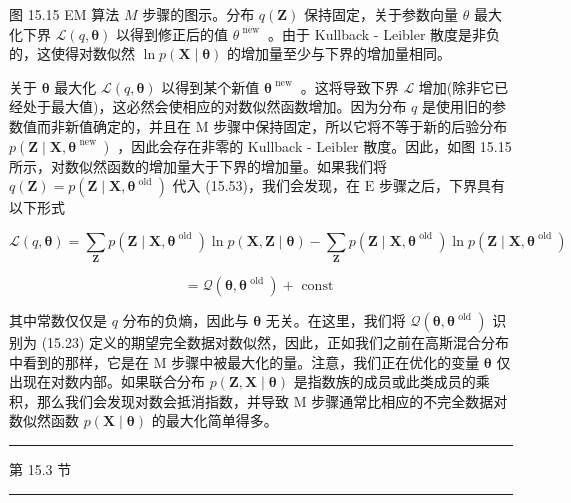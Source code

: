 \documentclass[10pt]{article}
\newcommand{\HRule}{\begin{center}\rule{0.9\linewidth}{0.2mm}\end{center}}
\begin{document}
图 15.15 EM 算法 \(M\) 步骤的图示。分布 \(q\left( \mathbf{Z}\right)\) 保持固定，关于参数向量 \(\theta\) 最大化下界 \(\mathcal{L}\left( {q,\mathbf{\theta }}\right)\) 以得到修正后的值 \({\theta }^{\text{ new }}\) 。由于 Kullback - Leibler 散度是非负的，这使得对数似然 \(\ln p\left( {\mathbf{X} \mid  \mathbf{\theta }}\right)\) 的增加量至少与下界的增加量相同。

关于 \(\mathbf{\theta }\) 最大化 \(\mathcal{L}\left( {q,\mathbf{\theta }}\right)\) 以得到某个新值 \({\mathbf{\theta }}^{\text{ new }}\) 。这将导致下界 \(\mathcal{L}\) 增加(除非它已经处于最大值)，这必然会使相应的对数似然函数增加。因为分布 \(q\) 是使用旧的参数值而非新值确定的，并且在 \(\mathrm{M}\) 步骤中保持固定，所以它将不等于新的后验分布 \(p\left( {\mathbf{Z} \mid  \mathbf{X},{\mathbf{\theta }}^{\text{ new }}}\right)\) ，因此会存在非零的 Kullback - Leibler 散度。因此，如图 15.15 所示，对数似然函数的增加量大于下界的增加量。如果我们将 \(q\left( \mathbf{Z}\right)  = p\left( {\mathbf{Z} \mid  \mathbf{X},{\mathbf{\theta }}^{\text{ old }}}\right)\) 代入 (15.53)，我们会发现，在 \(\mathrm{E}\) 步骤之后，下界具有以下形式

\[
\mathcal{L}\left( {q,\mathbf{\theta }}\right)  = \mathop{\sum }\limits_{\mathbf{Z}}p\left( {\mathbf{Z} \mid  \mathbf{X},{\mathbf{\theta }}^{\text{ old }}}\right) \ln p\left( {\mathbf{X},\mathbf{Z} \mid  \mathbf{\theta }}\right)  - \mathop{\sum }\limits_{\mathbf{Z}}p\left( {\mathbf{Z} \mid  \mathbf{X},{\mathbf{\theta }}^{\text{ old }}}\right) \ln p\left( {\mathbf{Z} \mid  \mathbf{X},{\mathbf{\theta }}^{\text{ old }}}\right)
\]

\[
= \mathcal{Q}\left( {\mathbf{\theta },{\mathbf{\theta }}^{\text{ old }}}\right)  + \text{ const } \tag{15.56}
\]

其中常数仅仅是 \(q\) 分布的负熵，因此与 \(\mathbf{\theta }\) 无关。在这里，我们将 \(\mathcal{Q}\left( {\mathbf{\theta },{\mathbf{\theta }}^{\text{ old }}}\right)\) 识别为 (15.23) 定义的期望完全数据对数似然，因此，正如我们之前在高斯混合分布中看到的那样，它是在 M 步骤中被最大化的量。注意，我们正在优化的变量 \(\mathbf{\theta }\) 仅出现在对数内部。如果联合分布 \(p\left( {\mathbf{Z},\mathbf{X} \mid  \mathbf{\theta }}\right)\) 是指数族的成员或此类成员的乘积，那么我们会发现对数会抵消指数，并导致 \(\mathrm{M}\) 步骤通常比相应的不完全数据对数似然函数 \(p\left( {\mathbf{X} \mid  \mathbf{\theta }}\right)\) 的最大化简单得多。

\HRule

第 15.3 节

\HRule
\end{document}
